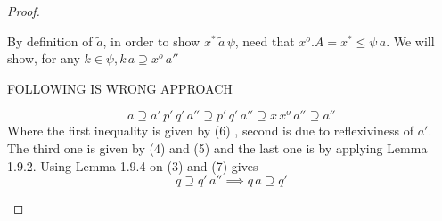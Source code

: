\documentclass[18pt,a4paper]{article}
\theoremstyle{definition}
\begin{document}
\begin{proof}
\begin{enumerate}[label=(\roman*)]
			 By definition of $\tilde{a}$, in order to show $x^* \, \tilde{a} \, \psi$,
			 need that $x^o.A=x^* \leq \psi\,a$. We will show, for any $ k\in \psi,
			 k\,a \supseteq x^o \, a''$

			 FOLLOWING IS WRONG APPROACH

			 \begin{equation}a\supseteq a'\,p'\,q'\,a'' \supseteq p'\,q'\,a'' \supseteq x \,x^o \,a''
			 \supseteq a''\end{equation}
			 Where the first inequality is given by (6) , second is due to reflexiviness
			 of $a'$. The third one is given by (4) and (5) and the last one is by applying
			 Lemma 1.9.2. Using Lemma 1.9.4 on (3) and (7) gives
			 \[ q \supseteq q'\,a'' \implies q\,a \supseteq q' \]
	\end{enumerate}
\end{proof}
\end{document}
